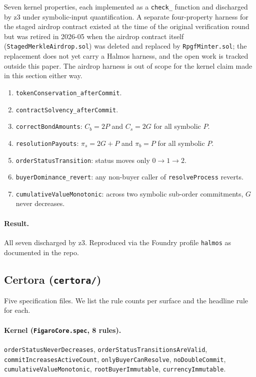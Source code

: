 \documentclass[11pt,a4paper]{article}
\theoremstyle{definition}
\theoremstyle{remark}
\newcommand{\pay}{P}
\newcommand{\cumval}{G}
\newcommand{\bbond}{C_b}
\newcommand{\sbond}{C_s}
\begin{document}
Seven kernel properties, each implemented as a \texttt{check\_}
function and discharged by z3 under symbolic-input quantification.
A separate four-property harness for the staged airdrop contract
existed at the time of the original verification round but was
retired in 2026-05 when the airdrop contract itself
(\texttt{StagedMerkleAirdrop.sol}) was deleted and replaced by
\texttt{RpgfMinter.sol}; the replacement does not yet carry a
Halmos harness, and the open work is tracked outside this paper.
The airdrop harness is out of scope for the kernel claim made in
this section either way.
\begin{enumerate}[label=\textbf{H\arabic*}]
  \item \texttt{tokenConservation\_afterCommit}.
  \item \texttt{contractSolvency\_afterCommit}.
  \item \texttt{correctBondAmounts}: $\bbond = 2\pay$ and
    $\sbond = 2\cumval$ for all symbolic $\pay$.
  \item \texttt{resolutionPayouts}: $\pi_s = 2\cumval + \pay$ and
    $\pi_b = \pay$ for all symbolic $\pay$.
  \item \texttt{orderStatusTransition}: status moves only
    $0 \to 1 \to 2$.
  \item \texttt{buyerDominance\_revert}: any non-buyer caller of
    \texttt{resolveProcess} reverts.
  \item \texttt{cumulativeValueMonotonic}: across two symbolic
    sub-order commitments, $\cumval$ never decreases.
\end{enumerate}

\paragraph{Result.}
All seven discharged by z3. Reproduced via the Foundry profile
\texttt{halmos} as documented in the repo.

\subsection{Certora (\texttt{certora/})}

Five specification files. We list the rule counts per surface and
the headline rule for each.

\paragraph{Kernel (\texttt{FigaroCore.spec}, 8 rules).}
\texttt{orderStatusNeverDecreases},
\texttt{orderStatusTransitionsAreValid},
\texttt{commitIncreasesActiveCount},
\texttt{onlyBuyerCanResolve},
\texttt{noDoubleCommit},
\texttt{cumulativeValueMonotonic},
\texttt{rootBuyerImmutable},
\texttt{currencyImmutable}.
\end{document}
